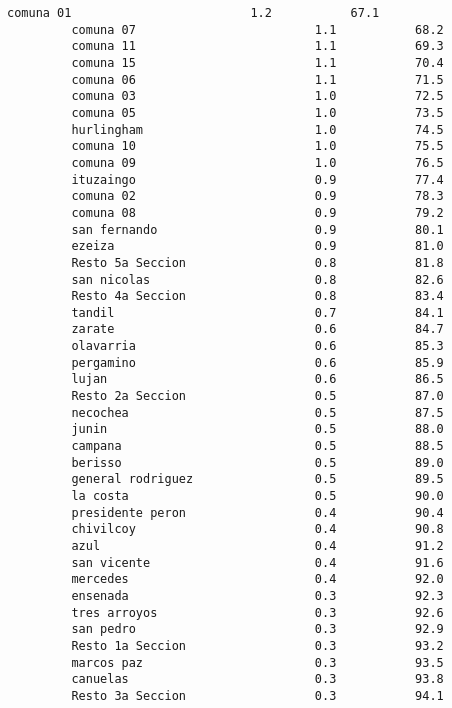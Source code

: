 \documentclass[11pt]{article}
\begin{document}
\begin{Verbatim}[commandchars=\\\{\}]
         comuna 01                         1.2           67.1
         comuna 07                         1.1           68.2
         comuna 11                         1.1           69.3
         comuna 15                         1.1           70.4
         comuna 06                         1.1           71.5
         comuna 03                         1.0           72.5
         comuna 05                         1.0           73.5
         hurlingham                        1.0           74.5
         comuna 10                         1.0           75.5
         comuna 09                         1.0           76.5
         ituzaingo                         0.9           77.4
         comuna 02                         0.9           78.3
         comuna 08                         0.9           79.2
         san fernando                      0.9           80.1
         ezeiza                            0.9           81.0
         Resto 5a Seccion                  0.8           81.8
         san nicolas                       0.8           82.6
         Resto 4a Seccion                  0.8           83.4
         tandil                            0.7           84.1
         zarate                            0.6           84.7
         olavarria                         0.6           85.3
         pergamino                         0.6           85.9
         lujan                             0.6           86.5
         Resto 2a Seccion                  0.5           87.0
         necochea                          0.5           87.5
         junin                             0.5           88.0
         campana                           0.5           88.5
         berisso                           0.5           89.0
         general rodriguez                 0.5           89.5
         la costa                          0.5           90.0
         presidente peron                  0.4           90.4
         chivilcoy                         0.4           90.8
         azul                              0.4           91.2
         san vicente                       0.4           91.6
         mercedes                          0.4           92.0
         ensenada                          0.3           92.3
         tres arroyos                      0.3           92.6
         san pedro                         0.3           92.9
         Resto 1a Seccion                  0.3           93.2
         marcos paz                        0.3           93.5
         canuelas                          0.3           93.8
         Resto 3a Seccion                  0.3           94.1

\end{Verbatim}
\end{document}
